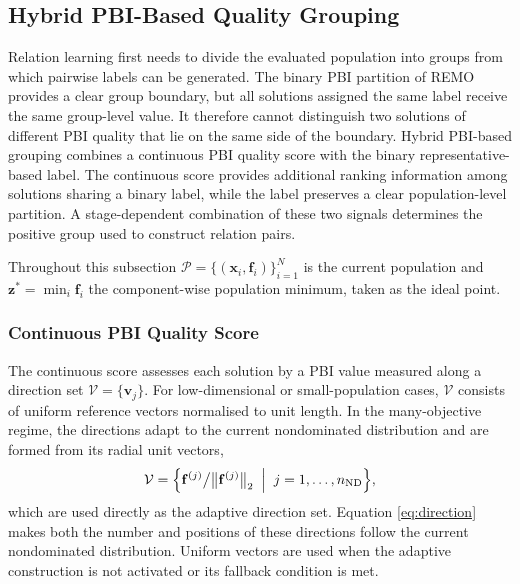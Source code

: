 \documentclass[final,5p,times,twocolumn]{elsarticle}
\newcommand{\vf}{\mathbf{f}}
\newcommand{\vx}{\mathbf{x}}
\newcommand{\vv}{\mathbf{v}}
\newcommand{\vz}{\mathbf{z}}
\begin{document}
\subsection{Hybrid PBI-Based Quality Grouping}
\label{sec:method:hpc}

Relation learning first needs to divide the evaluated population into groups
from which pairwise labels can be generated. The binary PBI partition of
REMO~\cite{ref:remo} provides a clear group boundary, but all solutions assigned
the same label receive the same group-level value. It therefore cannot
distinguish two solutions of different PBI quality that lie on the same side of
the boundary. Hybrid PBI-based grouping combines a continuous PBI quality score
with the binary representative-based label. The continuous score provides
additional ranking information among solutions sharing a binary label, while
the label preserves a clear population-level partition. A stage-dependent
combination of these two signals determines the positive group used to construct
relation pairs.

Throughout this subsection $\mathcal{P}=\{(\vx_i,\vf_i)\}_{i=1}^{N}$ is the
current population and $\vz^{*}=\min_i\vf_i$ the component-wise population
minimum, taken as the ideal point.

\subsubsection{Continuous PBI Quality Score}
\label{sec:method:hpc:cont}

The continuous score assesses each solution by a PBI value measured along a
direction set $\mathcal{V}=\{\vv_j\}$. For low-dimensional or small-population
cases, $\mathcal{V}$ consists of uniform reference vectors normalised to unit
length. In the many-objective regime, the directions adapt to the current
nondominated distribution and are formed from its radial unit vectors,
\begin{equation}
\mathcal{V}=\Bigl\{\vf^{(j)}\big/\bigl\|\vf^{(j)}\bigr\|_2
\;\Bigm|\;j=1,\ldots,n_{\mathrm{ND}}\Bigr\},
\label{eq:direction}
\end{equation}
which are used directly as the adaptive direction set. Equation
\eqref{eq:direction} makes both the number and positions of these directions
follow the current nondominated distribution. Uniform vectors are used when the
adaptive construction is not activated or its fallback condition is met.
\end{document}
